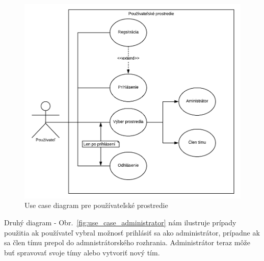 \begin{figure}[H]
    \centering
    \includegraphics[scale=0.50]{img/DP_use_case_pouzivatel.png}
    \caption{Use case diagram pre používateľské prostredie}
    \label{fig:use_case_pozivatel}
\end{figure}

\indent Druhý diagram - Obr.~\ref{fig:use_case_administrator} nám ilustruje prípady použitia ak používateľ vybral možnosť prihlásiť sa ako administrátor, prípadne ak sa člen tímu prepol do admnistrátorského rozhrania. Administrátor teraz môže buť spravovať svoje tímy alebo vytvoriť nový tím.

